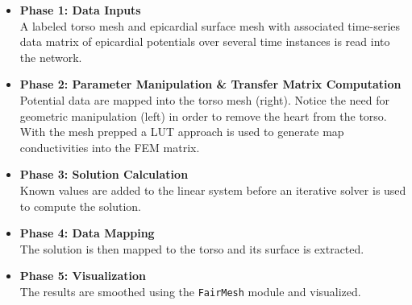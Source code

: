 \begin{itemize}
\item {\bf Phase 1: Data Inputs} \\
A labeled torso mesh and epicardial surface mesh with associated time-series data matrix of epicardial potentials over several time instances is read into the network. 
\item {\bf Phase 2: Parameter Manipulation \& Transfer Matrix Computation} \\
Potential data are mapped into the torso mesh (right). Notice the need for geometric manipulation (left) in order to remove the heart from the torso. With the mesh prepped a LUT approach is used to generate map conductivities into the FEM matrix.
\item {\bf Phase 3: Solution Calculation} \\ 
Known values are added to the linear system before an iterative solver is used to compute the solution.
\item {\bf Phase 4: Data Mapping} \\
The solution is then mapped to the torso and its surface is extracted. 
\item {\bf Phase 5: Visualization} \\
The results are smoothed using the {\tt FairMesh} module and visualized.
\end{itemize}

